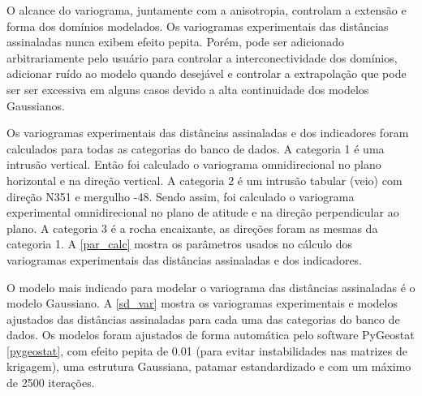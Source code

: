 O alcance do variograma, juntamente com a anisotropia, controlam a extensão e forma dos domínios modelados. Os variogramas experimentais das distâncias assinaladas nunca exibem efeito pepita. Porém, pode ser adicionado arbitrariamente pelo usuário para controlar a interconectividade dos domínios, adicionar ruído ao modelo quando desejável e controlar a extrapolação que pode ser ser excessiva em alguns casos devido a alta continuidade dos modelos Gaussianos.

Os variogramas experimentais das distâncias assinaladas e dos indicadores foram calculados para todas as categorias do banco de dados. A categoria 1 
é uma intrusão vertical. Então foi calculado o variograma omnidirecional no plano horizontal e na direção vertical. A categoria 2 é um intrusão tabular (veio) com direção N351 e mergulho -48. Sendo assim, foi calculado o variograma experimental omnidirecional no plano de atitude e na direção perpendicular ao plano. A categoria 3 é a rocha encaixante, as direções foram as mesmas da categoria 1. A \autoref{par_calc} mostra os parâmetros usados no cálculo dos variogramas experimentais das distâncias assinaladas e dos indicadores.

\begin{table}[H]
\centering
{}
\caption{Parâmetros de cálculo dos variogramas experimentais.} \label{par_calc}
\end{table}

O modelo mais indicado para modelar o variograma das distâncias assinaladas é o modelo Gaussiano. A \autoref{sd_var} mostra os variogramas experimentais e modelos ajustados das distâncias assinaladas para cada uma das categorias do banco de dados. Os modelos foram ajustados de forma automática pelo software PyGeostat \autoref{pygeostat}, com efeito pepita de 0.01 (para evitar instabilidades nas matrizes de krigagem), uma estrutura Gaussiana, patamar estandardizado e com um máximo de 2500 iterações.  

